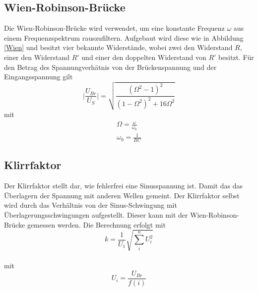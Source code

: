     \subsection{Wien-Robinson-Brücke}
    Die Wien-Robinson-Brücke wird verwendet, um eine konstante Frequenz $\omega$ aus einem Frequenzspektrum rauszufiltern.
    Aufgebaut wird diese wie in Abbildung \ref{Wien} und besitzt vier bekannte Widerstände, wobei zwei den Widerstand $R$, einer den Widerstand $R'$ und einer den doppelten Widerstand von $R'$ besitzt.
    Für den Betrag des Spannungverhätnis von der Brückenspannung und der Eingangsspannung gilt 
    \begin{equation}
       \biggl|\frac{U_{Br}}{U_S}\biggr|=\sqrt{\frac{(\Omega^2-1)^2}{(1-\Omega^2)^2+16\Omega^2}}
    \end{equation}
    mit 
    \begin{gather}
        \Omega=\frac{\omega}{\omega_0}\\
        \omega_0=\frac{1}{RC}
    \end{gather}

    \subsection{Klirrfaktor}
    Der Klirrfaktor stellt dar, wie fehlerfrei eine Sinusspannung ist. 
    Damit das das Überlagern der Spannung mit anderen Wellen gemeint.
    Der Klirrfaktor selbst wird durch das Verhältnis von der Sinus-Schwingung mit Überlagerungsschwingungen aufgestellt.
    Dieser kann mit der Wien-Robinson-Brücke gemessen werden.       
    Die Berechnung erfolgt mit 
    \begin{equation}
        k=\frac{1}{U_1}\sqrt{\sum_{i}^{n}{U_i^2}}
    \end{equation}\\
    mit
    \begin{equation}
        U_i=\frac{U_{Br}}{f(i)}
    \end{equation}

